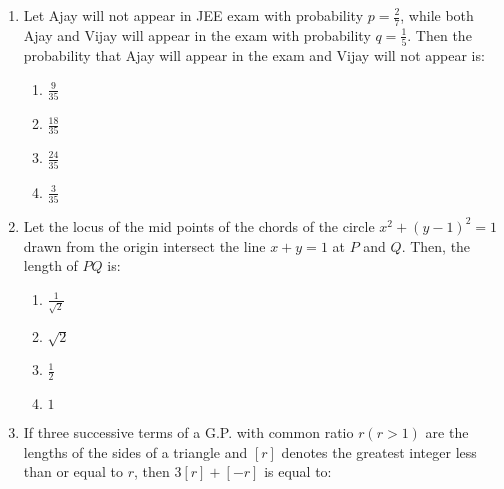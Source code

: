 \documentclass[journal]{IEEEtran}
\newcommand{\brak}[1]{\left( #1 \right)}
\begin{document}
\begin{enumerate}
        \begin{multicols}{4}
        \begin{enumerate}
        \item $2$
        \item $\frac{3}{2}$
        \item $\frac{5}{2}$
        \item $1$
        \end{enumerate}
        \end{multicols}

    \item Let Ajay will not appear in JEE exam with probability $p=\frac{2}{7}$, while both Ajay and Vijay will appear in the exam with probability $q=\frac{1}{5}$. Then the probability that Ajay will appear in the exam and Vijay will not appear is:

        \begin{multicols}{4}
        \begin{enumerate}
        \item $\frac{9}{35}$
        \item $\frac{18}{35}$
        \item $\frac{24}{35}$
        \item $\frac{3}{35}$
        \end{enumerate}
        \end{multicols}
        
    \item Let the locus of the mid points of the chords of the circle $x^{2}+(y-1)^{2}=1$ drawn from the origin intersect the line $x+y=1$ at $P$ and $Q$. Then, the length of $PQ$ is:

        \begin{multicols}{4}
        \begin{enumerate}
        \item $\frac{1}{\sqrt{2}}$
        \item $\sqrt{2}$
        \item $\frac{1}{2}$
        \item $1$
        \end{enumerate}
        \end{multicols}
        
    \item If three successive terms of a G.P. with common ratio $r\brak{r>1}$ are the lengths of the sides of a triangle and $[r]$ denotes the greatest integer less than or equal to $r$, then $3[r]+[-r]$ is equal to:


\end{enumerate}
\end{document}
